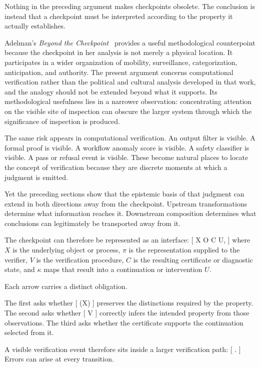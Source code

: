 \documentclass[11pt]{article}
\begin{document}
Nothing in the preceding argument makes checkpoints obsolete. The conclusion is instead that a checkpoint must be interpreted according to the property it actually establishes.

Adelman's \emph{Beyond the Checkpoint}~\cite{adelman2014} provides a useful methodological counterpoint because the checkpoint in her analysis is not merely a physical location. It participates in a wider organization of mobility, surveillance, categorization, anticipation, and authority. The present argument concerns computational verification rather than the political and cultural analysis developed in that work, and the analogy should not be extended beyond what it supports. Its methodological usefulness lies in a narrower observation: concentrating attention on the visible site of inspection can obscure the larger system through which the significance of inspection is produced.

The same risk appears in computational verification. An output filter is visible. A formal proof is visible. A workflow anomaly score is visible. A safety classifier is visible. A pass or refusal event is visible. These become natural places to locate the concept of verification because they are discrete moments at which a judgment is emitted.

Yet the preceding sections show that the epistemic basis of that judgment can extend in both directions away from the checkpoint. Upstream transformations determine what information reaches it. Downstream composition determines what conclusions can legitimately be transported away from it.

The checkpoint can therefore be represented as an interface:
[
X
\xrightarrow{\pi}
O
C
\xrightarrow{\kappa}
U,
]
where $X$ is the underlying object or process, $\pi$ is the representation supplied to the verifier, $V$ is the verification procedure, $C$ is the resulting certificate or diagnostic state, and $\kappa$ maps that result into a continuation or intervention $U$.

Each arrow carries a distinct obligation.

The first asks whether
[
\pi(X)
]
preserves the distinctions required by the property. The second asks whether
[
V
]
correctly infers the intended property from those observations. The third asks whether the certificate supports the continuation selected from it.

A visible verification event therefore sits inside a larger verification path:
[
\longrightarrow
{}
\longrightarrow
{}
\longrightarrow
{}.
]
Errors can arise at every transition.
\end{document}

